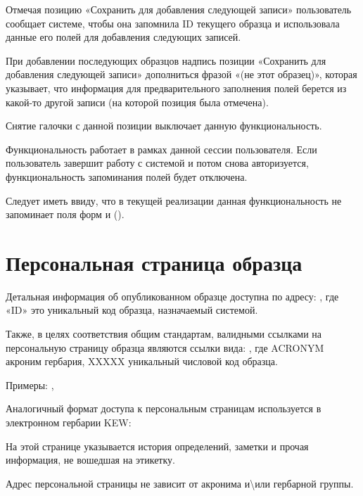 \documentclass[letterpaper,10pt,russian]{sphinxmanual}
\begin{document}
Отмечая позицию «Сохранить для добавления следующей записи» пользователь
сообщает системе, чтобы она запомнила ID текущего образца и использовала
данные его полей для добавления следующих записей.

При добавлении последующих образцов надпись позиции «Сохранить для
добавления следующей записи» дополниться
фразой «(не этот образец)», которая указывает, что информация для
предварительного заполнения полей берется из какой-то другой записи
(на которой позиция была отмечена).

Снятие галочки с данной позиции выключает данную функциональность.

Функциональность работает в рамках данной сессии пользователя. Если
пользователь завершит работу с системой и потом снова авторизуется,
функциональность запоминания полей будет отключена.

Следует иметь ввиду, что в текущей реализации данная функциональность не
запоминает поля форм {\hyperref[\detokenize{main:id37}]{}} и {\hyperref[\detokenize{main:id38}]{}}
().

\ignorespaces 

\section{Персональная страница образца}
\label{\detokenize{main:index-36}}\label{\detokenize{main:id39}}
Детальная информация об опубликованном образце доступна по адресу: ,
где «ID» это уникальный код образца, назначаемый системой.

Также, в целях соответствия общим стандартам, валидными ссылками на персональную страницу
образца являются ссылки вида: , где ACRONYM \textendash{}
акроним гербария, XXXXX \textendash{} уникальный числовой код образца.

Примеры: , 

Аналогичный формат доступа к персональным страницам используется в электронном
гербарии KEW: 

На этой странице указывается история определений,
заметки и прочая информация, не вошедшая на этикетку.

Адрес персональной страницы не зависит от
акронима и\textbackslash{}или гербарной группы.
\end{document}
